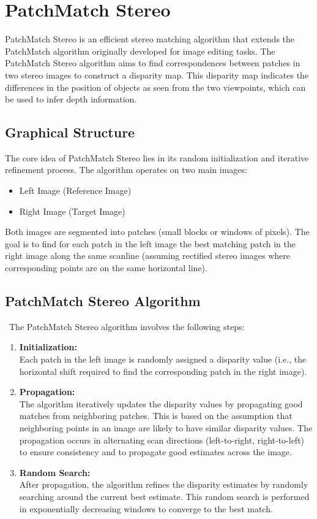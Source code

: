 \documentclass[22pt]{report}
\begin{document}
\section{PatchMatch Stereo}
PatchMatch Stereo is an efficient stereo matching algorithm that extends the PatchMatch algorithm originally developed for image editing tasks. The PatchMatch Stereo algorithm aims to find correspondences between patches in two stereo images to construct a disparity map. This disparity map indicates the differences in the position of objects as seen from the two viewpoints, which can be used to infer depth information.\\
\subsection{Graphical Structure}
The core idea of PatchMatch Stereo lies in its random initialization and iterative refinement process. The algorithm operates on two main images:\\
\begin{itemize}
    \item Left Image (Reference Image)
    \item Right Image (Target Image)
\end{itemize}
Both images are segmented into patches (small blocks or windows of pixels). The goal is to find for each patch in the left image the best matching patch in the right image along the same scanline (assuming rectified stereo images where corresponding points are on the same horizontal line).

\vspace{20}
\subsection{PatchMatch Stereo Algorithm}
\
The PatchMatch Stereo algorithm involves the following steps:
\begin{enumerate}
    \item \textbf{Initialization:} \\
Each patch in the left image is randomly assigned a disparity value (i.e., the horizontal shift required to find the corresponding patch in the right image).
    \item \textbf{Propagation:} \\
    The algorithm iteratively updates the disparity values by propagating good matches from neighboring patches. This is based on the assumption that neighboring points in an image are likely to have similar disparity values. The propagation occurs in alternating scan directions (left-to-right, right-to-left) to ensure consistency and to propagate good estimates across the image.
    \item \textbf{Random Search:} \\
    After propagation, the algorithm refines the disparity estimates by randomly searching around the current best estimate. This random search is performed in exponentially decreasing windows to converge to the best match.
    
\end{enumerate}
\vspace{15}
\end{document}
